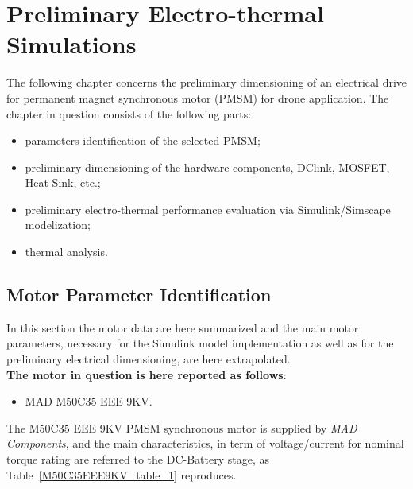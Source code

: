 \documentclass[11pt,a4paper,oneside]{book}
\title{\textbf{ 
	\begin{LARGE}
		Drone Inverter Design
	\end{LARGE} \\[24pt]
	\begin{Large}
		Model, control strategy and hardware dimensioning 
	\end{Large}}
}
\author{\textbf{Davide Bagnara}}
\numberwithin{equation}{section}
\theoremstyle{it}
\theoremstyle{definition}
\begin{document}
	\thispagestyle{firstpage}
	\begin{mybox}
		\maketitle
		\vspace{120mm}
	\end{mybox}
	\newpage
	\tableofcontents
	\listoffigures	
	\listoftables
	\newpage
	

\chapter{Preliminary Electro-thermal Simulations}
The following chapter concerns the preliminary dimensioning of an electrical drive for permanent magnet synchronous motor (PMSM) for drone application. The chapter in question consists of the following parts:
\begin{itemize}
	\item[--] parameters identification of the selected PMSM;
	\item[--] preliminary dimensioning of the hardware components, DClink, MOSFET, Heat-Sink, etc.;
	\item[--] preliminary electro-thermal performance evaluation via Simulink/Simscape modelization;	
	\item[--] thermal analysis.
\end{itemize}

\section{Motor Parameter Identification}
In this section the motor data are here summarized and the main motor parameters, necessary for the Simulink model implementation as well as for the preliminary electrical dimensioning, are here extrapolated. \\

\noindent \textbf{The motor in question is here reported as follows}:
\begin{itemize}
	\item[--] MAD M50C35 EEE 9KV.
\end{itemize} 

The M50C35 EEE 9KV PMSM synchronous motor is supplied by \textit{MAD Components}, and the main characteristics, in term of voltage/current for nominal torque rating are referred to the DC-Battery stage, as Table~\ref{M50C35EEE9KV_table_1} reproduces.
\end{document}
